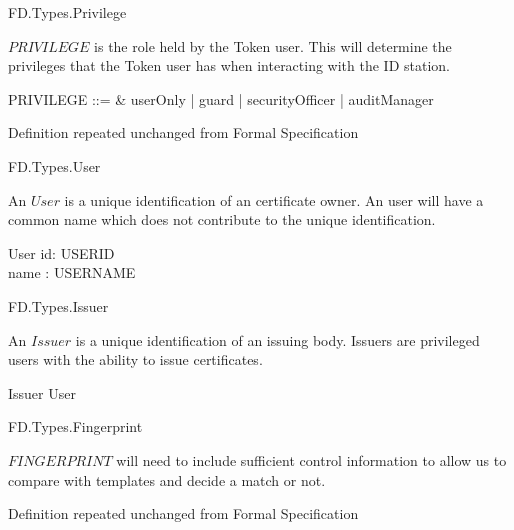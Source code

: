 \begin{traceunit}{FD.Types.Privilege}
\end{traceunit}


$PRIVILEGE$ is the role held by the Token user. This will determine
the privileges that the Token user has when interacting with the ID
station.
\begin{syntax}
        PRIVILEGE ::= & userOnly | guard | securityOfficer | auditManager 
\end{syntax}
\begin{Zcomment}
\item Definition repeated unchanged from Formal Specification \cite{FS}
\end{Zcomment}

\begin{traceunit}{FD.Types.User}
\end{traceunit}

An $User$ is a unique identification of an certificate owner. An user
will have a common name which does not contribute to the unique
identification.  

\begin{zed}
\end{zed}

\begin{schema}{User}
        id: USERID
\\      name : USERNAME
\end{schema}

\begin{traceunit}{FD.Types.Issuer}
\end{traceunit}


An $Issuer$ is a unique identification of an issuing body. Issuers are
privileged users with the ability to issue certificates. 

\begin{schema}{Issuer}
        User
\end{schema}

\begin{traceunit}{FD.Types.Fingerprint}
\end{traceunit}

$FINGERPRINT$ will need to include sufficient control information to allow
us to compare with templates and decide a match or not.
\begin{zed}
	[ FINGERPRINT ]
\end{zed}
\begin{Zcomment}
\item Definition repeated unchanged from Formal Specification \cite{FS}
\end{Zcomment}


